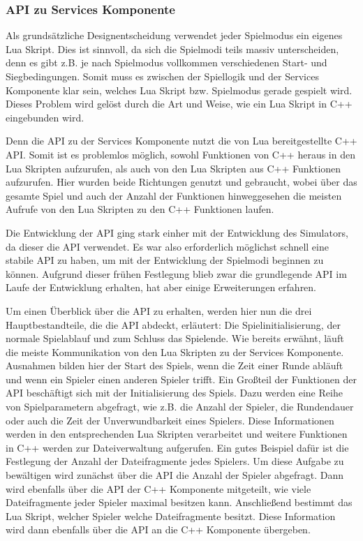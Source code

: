 \subsubsection{API zu Services Komponente}
Als grundsätzliche Designentscheidung verwendet jeder Spielmodus ein eigenes Lua Skript.
Dies ist sinnvoll, da sich die Spielmodi teils massiv unterscheiden, denn es gibt z.B. je nach
Spielmodus vollkommen verschiedenen Start- und Siegbedingungen. Somit muss es
zwischen der Spiellogik und der Services Komponente klar sein, welches Lua Skript bzw.
Spielmodus gerade gespielt wird. Dieses Problem wird gelöst durch die Art und Weise, wie
ein Lua Skript in C++ eingebunden wird.

Denn die API zu der Services Komponente nutzt die von Lua bereitgestellte C++ API. Somit
ist es problemlos möglich, sowohl Funktionen von C++ heraus in den Lua Skripten
aufzurufen, als auch von den Lua Skripten aus C++ Funktionen aufzurufen. Hier wurden
beide Richtungen genutzt und gebraucht, wobei über das gesamte Spiel und auch der
Anzahl der Funktionen hinweggesehen die meisten Aufrufe von den Lua Skripten zu den C++ Funktionen laufen.

Die Entwicklung der API ging stark einher mit der Entwicklung des Simulators, da dieser die
API verwendet. Es war also erforderlich möglichst schnell eine stabile API zu haben, um mit
der Entwicklung der Spielmodi beginnen zu können. Aufgrund dieser frühen Festlegung
blieb zwar die grundlegende API im Laufe der Entwicklung erhalten, hat aber einige
Erweiterungen erfahren.

Um einen Überblick über die API zu erhalten, werden hier nun die drei Hauptbestandteile,
die die API abdeckt, erläutert: Die Spielinitialisierung, der normale Spielablauf und zum
Schluss das Spielende.
Wie bereits erwähnt, läuft die meiste Kommunikation von den Lua Skripten zu der Services
Komponente. Ausnahmen bilden hier der Start des Spiels, wenn die Zeit einer Runde abläuft
und wenn ein Spieler einen anderen Spieler trifft. Ein Großteil der Funktionen der API
beschäftigt sich mit der Initialisierung des Spiels. Dazu werden eine Reihe von
Spielparametern abgefragt, wie z.B. die Anzahl der Spieler, die Rundendauer oder auch die
Zeit der Unverwundbarkeit eines Spielers. Diese Informationen werden in den
entsprechenden Lua Skripten verarbeitet und weitere Funktionen in C++ werden zur
Dateiverwaltung aufgerufen.
Ein gutes Beispiel dafür ist die Festlegung der Anzahl der Dateifragmente jedes Spielers.
Um diese Aufgabe zu bewältigen wird zunächst über die API die Anzahl der Spieler
abgefragt. Dann wird ebenfalls über die API der C++ Komponente mitgeteilt, wie viele
Dateifragmente jeder Spieler maximal besitzen kann. Anschließend bestimmt das Lua
Skript, welcher Spieler welche Dateifragmente besitzt. Diese Information wird dann
ebenfalls über die API an die C++ Komponente übergeben.

